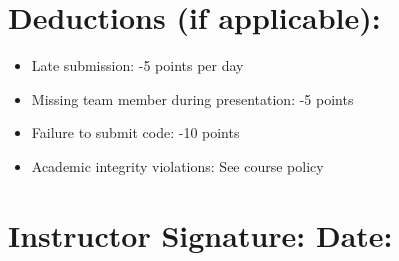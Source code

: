 \documentclass[11pt,landscape]{article}
\begin{document}
\section*{Deductions (if applicable):}
\begin{itemize}
\item Late submission: -5 points per day
\item Missing team member during presentation: -5 points
\item Failure to submit code: -10 points
\item Academic integrity violations: See course policy
\end{itemize}

\section*{Instructor Signature: \underline{\hspace{5cm}} Date: \underline{\hspace{3cm}}}
\end{document}
